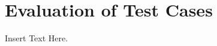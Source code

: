 \documentclass[12pt]{article}
\begin{document}
\section{Evaluation of Test Cases}
Insert Text Here.
\end{document}
